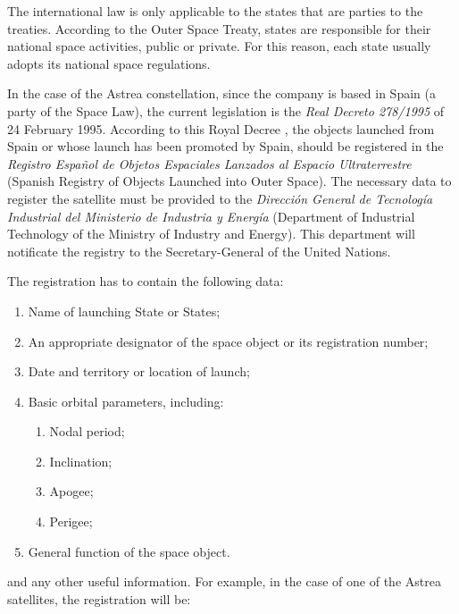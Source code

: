 The international law is only applicable to the states that are parties to the treaties. According to the Outer Space Treaty, states are responsible for their national space activities, public or private. For this reason, each state usually adopts its national space regulations.

In the case of the Astrea constellation, since the company is based in Spain (a party of the Space Law), the current legislation is the \textit{Real Decreto 278/1995} of 24 February 1995. According to this Royal Decree \cite{Espana.MinisteriodelaPresidencia1995}, the objects launched from Spain or whose launch has been promoted by Spain, should be registered in the \textit{Registro Español de Objetos Espaciales Lanzados al Espacio Ultraterrestre} (Spanish Registry of Objects Launched into Outer Space). The necessary data to register the satellite must be provided to the \textit{Dirección General de Tecnología Industrial del Ministerio de Industria y Energía} (Department of Industrial Technology of the Ministry of Industry and Energy). This department will notificate the registry to the Secretary-General of the United Nations.

The registration has to contain the following data:

\begin{enumerate}[label=\alph*)]
\item Name of launching State or States;
\item An appropriate designator of the space object or its registration number;
\item Date and territory or location of launch;
\item Basic orbital parameters, including:
\begin{enumerate}[label=\Roman*)]
\item Nodal period;
\item Inclination;
\item Apogee;
\item Perigee;
\end{enumerate}
\item General function of the space object.
\end{enumerate}

and any other useful information.
For example, in the case of one of the Astrea satellites, the registration will be:

